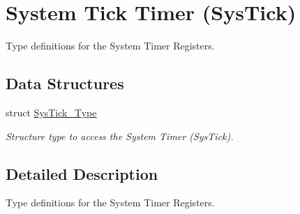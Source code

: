 \hypertarget{group___c_m_s_i_s___sys_tick}{\section{System Tick Timer (Sys\-Tick)}
\label{group___c_m_s_i_s___sys_tick}
}


Type definitions for the System Timer Registers.  


\subsection*{Data Structures}
\begin{DoxyCompactItemize}
\item 
struct \hyperlink{struct_sys_tick___type}{Sys\-Tick\-\_\-\-Type}
\begin{DoxyCompactList}\small\item\em Structure type to access the System Timer (Sys\-Tick). \end{DoxyCompactList}\end{DoxyCompactItemize}


\subsection{Detailed Description}
Type definitions for the System Timer Registers. 